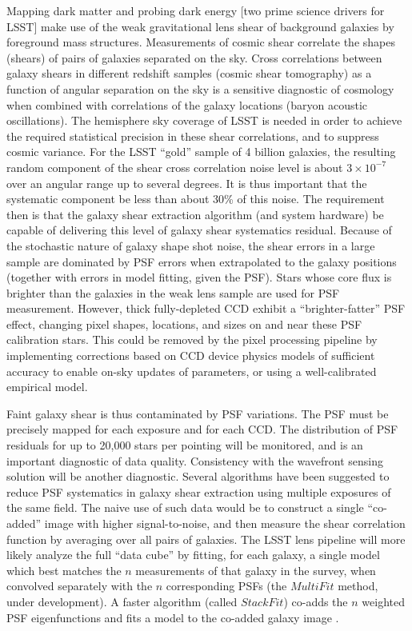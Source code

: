 \documentclass[SE,toc,lsstdraft]{lsstdoc}
\begin{document}
Mapping dark matter and probing dark energy [two prime science drivers for LSST] make use of the weak gravitational lens shear of background galaxies by foreground mass structures. Measurements of cosmic shear correlate the shapes (shears) of pairs of galaxies separated on the sky.  Cross correlations between galaxy shears in different redshift samples (cosmic shear tomography) as a function of angular separation on the sky is a sensitive diagnostic of cosmology when combined with correlations of the galaxy locations (baryon acoustic oscillations). The hemisphere sky coverage of LSST is needed in order to achieve the required statistical precision in these shear correlations, and to suppress cosmic variance.  For the LSST ``gold'' sample of 4 billion galaxies, the resulting random component of the shear cross correlation noise level is about $3\times10^{-7}$ over an angular range up to several degrees.  It is thus important that the systematic component be less than about 30\% of this noise.  The requirement then is that the galaxy shear extraction algorithm (and system hardware) be capable of delivering this level of galaxy shear systematics residual.  Because of the stochastic nature of galaxy shape shot noise, the shear errors in a large sample are dominated by PSF errors when extrapolated to the galaxy positions (together with errors in model fitting, given the PSF).
Stars whose core flux is brighter than the galaxies in the weak lens sample are used for PSF measurement.
However, thick fully-depleted CCD exhibit a ``brighter-fatter'' PSF effect, changing pixel shapes, locations, and sizes on and near these PSF calibration stars.
This could be removed by the pixel processing pipeline by implementing corrections based on CCD device physics models of sufficient accuracy to enable on-sky updates of parameters, or using a well-calibrated empirical model.

Faint galaxy shear is thus contaminated by PSF variations. The PSF must be precisely mapped for each exposure and for each CCD. The distribution of PSF residuals for up to 20,000 stars per pointing will be monitored, and is an important diagnostic of data quality. Consistency with the wavefront sensing solution will be another diagnostic.
Several algorithms have been suggested to reduce PSF systematics in galaxy shear extraction using multiple exposures of the same field.  The naive use of such data would be to construct a single ``co-added'' image with higher signal-to-noise, and then measure the shear correlation function by averaging over all pairs of galaxies.  The LSST lens pipeline will more likely analyze the full ``data cube'' by fitting, for each galaxy, a single model which best matches the $n$ measurements of that galaxy in the survey, when convolved separately with the $n$ corresponding PSFs (the $MultiFit$ method, under development). A faster algorithm (called $StackFit$) co-adds the $n$ weighted PSF eigenfunctions and fits a model to the co-added galaxy image \citep{2011PASP..123..596J}.
\end{document}
